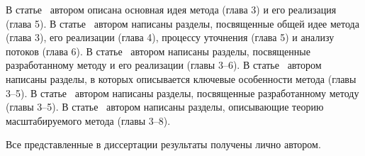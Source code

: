 В статье~\cite{lockatorVAK} автором описана основная идея метода (глава 3) и его реализация (глава 5).
В статье~\cite{lockatorVAK2} автором написаны разделы, посвященные общей идее метода (глава 3), его реализации (глава 4), процессу уточнения (глава 5) и анализу потоков (глава 6).
В статье~\cite{TMPA2017} автором написаны разделы, посвященные разработанному методу и его реализации (главы 3--6).
В статье~\cite{lockatorSyrcose} автором написаны разделы, в которых описывается ключевые особенности метода (главы 3--5).
В статье~\cite{lockatorTMPA} автором написаны разделы, посвященные разработанному методу (главы 3--5).
В статье~\cite{LockatorScalable} автором написаны разделы, описывающие теорию масштабируемого метода (главы 3--8).

{\contribution} Все представленные в диссертации результаты получены лично автором.